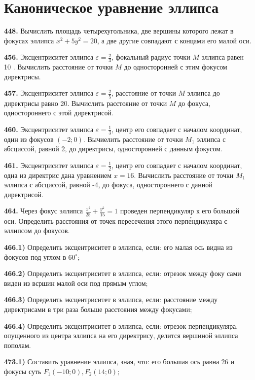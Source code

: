 \section{Каноническое уравнение эллипса}



\textbf{448.} Вычислить площадь четырехугольника, две вершины которого лежат в фокусах эллипса $x^2+5 y^2=20$, а две другие совпадают с концами его малой оси.

\textbf{456.} Эксцентриситет эллипса $\varepsilon=\frac{2}{3}$, фокальный радиус точки $M$ эллипса равен 10 . Вычислить расстояние от точки $M$ до односторонней с этим фокусом директрисы.

\textbf{457.} Эксцентриситет эллипса $\varepsilon=\frac{2}{5}$, расстояние от точки $M$ эллипса до директрисы равно 20. Вычислить расстояние от точки $M$ до фокуса, одностороннего с этой директрисой.

\textbf{460.} Эксцентриситет эллипса $\varepsilon=\frac{1}{3}$, центр его совпадает с началом координат, один из фокусов $(-2 ; 0)$. Вычиелить расстояние от точки $M_1$ эллипса с абсциссой, равной 2, до директрисы, односторонней с данным фокусом.

\textbf{461.} Эксцентриситет эллипса $\varepsilon=\frac{1}{2}$, центр его совпадает с началом координат, одна из директрис дана уравнением $x=16$. Вычислить расстояние от точки $M_1$ эллипса с абсциссой, равной -4, до фокуса, одностороннего с данной директрисой.

\textbf{464.} Через фокус эллипса $\frac{x^2}{25}+\frac{y^2}{15}=1$ проведен перпендикуляр к его большой оси. Определить расстояния от точек пересечения этого перпе́ндикуляра с эллипсом до фокусов.

\textbf{466.1)} Определить эксцентриситет в эллипса, если: его малая ось видна из фокусов под углом в $60^{\circ}$;

\textbf{466.2)} Определить эксцентриситет в эллипса, если: отрезок между фоку сами виден из вєршин малой оси под прямым углом;

\textbf{466.3)} Определить эксцентриситет в эллипса, если: расстояние между директрисами в три раза больше расстояния между фокусами;

\textbf{466.4)} Определить эксцентриситет в эллипса, если: отрезок перпендикуляра, опущенного из центра эллипса на его директрису, делится вершиной эллипса пополам.

\textbf{473.1)} Составить уравнение эллипса, зная, что: его большая ось равна 26 и фокусы суть $F_1(-10 ; 0), F_2(14 ; 0)$;

